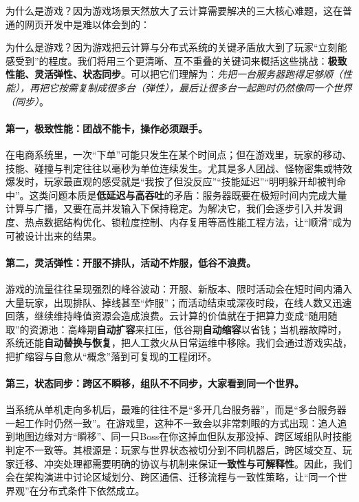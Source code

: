 为什么是游戏？因为游戏场景天然放大了云计算需要解决的三大核心难题，这在普通的网页开发中是难以体会到的：

为什么是游戏？因为游戏把云计算与分布式系统的关键矛盾放大到了玩家“立刻能感受到”的程度。我们将用三个更清晰、互不重叠的关键词来概括这些挑战：\textbf{极致性能、灵活弹性、状态同步}。可以把它们理解为：\emph{先把一台服务器跑得足够顺（性能），再把它按需复制成很多台（弹性），最后让很多台一起跑时仍然像同一个世界（同步）}。

\paragraph{第一，极致性能：团战不能卡，操作必须跟手。}
在电商系统里，一次“下单”可能只发生在某个时间点；但在游戏里，玩家的移动、技能、碰撞与判定往往以毫秒为单位连续发生。尤其是多人团战、怪物密集或特效爆发时，玩家最直观的感受就是“我按了但没反应”“技能延迟”“明明躲开却被判命中”。这类问题本质是\textbf{低延迟与高吞吐}的矛盾：服务器既要在极短时间内完成大量计算与广播，又要在高并发输入下保持稳定。为解决它，我们会逐步引入并发调度、热点数据结构优化、锁粒度控制、内存复用等高性能工程方法，让“顺滑”成为可被设计出来的结果。

\paragraph{第二，灵活弹性：开服不排队，活动不炸服，低谷不浪费。}
游戏的流量往往呈现强烈的峰谷波动：开服、新版本、限时活动会在短时间内涌入大量玩家，出现排队、掉线甚至“炸服”；而活动结束或深夜时段，在线人数又迅速回落，继续维持峰值资源会造成浪费。云计算的价值就在于把算力变成“随用随取”的资源池：高峰期\textbf{自动扩容}来扛压，低谷期\textbf{自动缩容}以省钱；当机器故障时，系统还能\textbf{自动替换与恢复}，把人工救火从日常运维中移除。我们会通过游戏实战，把扩缩容与自愈从“概念”落到可复现的工程闭环。

\paragraph{第三，状态同步：跨区不瞬移，组队不不同步，大家看到同一个世界。}
当系统从单机走向多机后，最难的往往不是“多开几台服务器”，而是“多台服务器一起工作时仍然一致”。在游戏里，这种不一致会以非常刺眼的方式出现：追人追到地图边缘对方“瞬移”、同一只Boss在你这掉血但队友那没掉、跨区域组队时技能判定不一致等。其根源是：玩家与世界状态被切分到不同机器后，跨区域交互、玩家迁移、冲突处理都需要明确的协议与机制来保证\textbf{一致性与可解释性}。因此，我们会在架构演进中讨论区域划分、跨区通信、迁移流程与一致性策略，让“同一个世界观”在分布式条件下依然成立。

